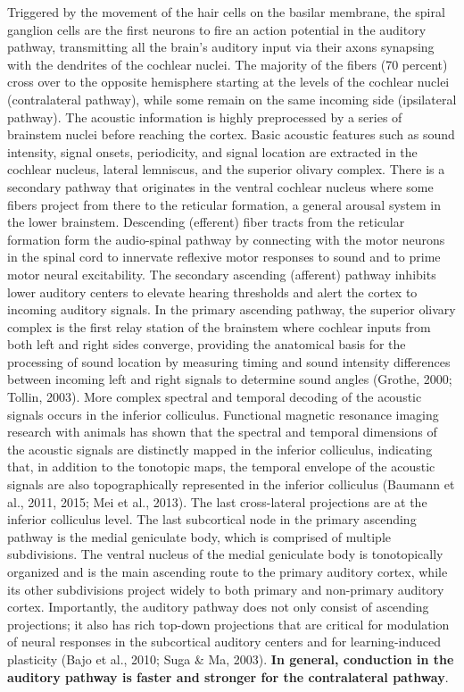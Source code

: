 \documentclass{article}
\begin{document}
Triggered by the movement of the hair cells on the basilar membrane, the spiral ganglion cells are the first neurons to fire an action potential in the auditory pathway, transmitting all the brain's auditory input via their axons synapsing with the dendrites of the cochlear nuclei. The majority of the fibers (70 percent) cross over to the opposite hemisphere starting at the levels of the cochlear nuclei (contralateral pathway), while some remain on the same incoming side (ipsilateral pathway). The acoustic information is highly preprocessed by a series of brainstem nuclei before reaching the cortex. Basic acoustic features such as sound intensity, signal onsets, periodicity, and signal location are extracted in the cochlear nucleus, lateral lemniscus, and the superior olivary complex. There is a secondary pathway that originates in the ventral cochlear nucleus where some fibers project from there to the reticular formation, a general arousal system in the lower brainstem. Descending (efferent) fiber tracts from the reticular formation form the audio-spinal pathway by connecting with the motor neurons in the spinal cord to innervate reflexive motor responses to sound and to prime motor neural excitability. The secondary ascending (afferent) pathway inhibits lower auditory centers to elevate hearing thresholds and alert the cortex to incoming auditory signals.
In the primary ascending pathway, the superior olivary complex is the first relay station of the brainstem where cochlear inputs from both left and right sides converge, providing the anatomical basis for the processing of sound location by measuring timing and sound intensity differences between incoming left and right signals to determine sound angles (Grothe, 2000; Tollin, 2003). More complex spectral and temporal decoding of the acoustic signals occurs in the inferior colliculus. Functional magnetic resonance imaging research with animals has shown that the spectral and temporal dimensions of the acoustic signals are distinctly mapped in the inferior colliculus, indicating that, in addition to the tonotopic maps, the temporal envelope of the acoustic signals are also topographically represented in the inferior colliculus (Baumann et al., 2011, 2015; Mei et al., 2013). The last cross-lateral projections are at the inferior colliculus level.
The last subcortical node in the primary ascending pathway is the medial geniculate body, which is comprised of multiple subdivisions. The ventral nucleus of the medial geniculate body is tonotopically organized and is the main ascending route to the primary auditory cortex, while its other subdivisions project widely to both primary and non-primary auditory cortex. Importantly, the auditory pathway does not only consist of ascending projections; it also has rich top-down projections that are critical for modulation of neural responses in the subcortical auditory centers and for learning-induced plasticity (Bajo et al., 2010; Suga \& Ma, 2003). \textbf{In general, conduction in the auditory pathway is faster and stronger for the contralateral pathway}.
\end{document}
